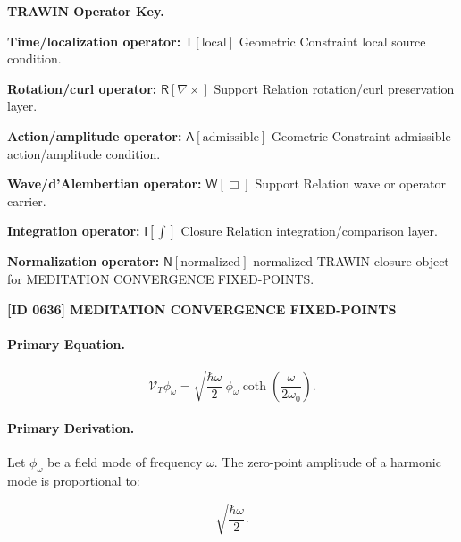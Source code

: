 \par\vspace{0.45\baselineskip}
\noindent\begin{minipage}[t]{\linewidth}
\begingroup
\small
\raggedright
\textbf{TRAWIN Operator Key.}\par
\noindent\textbf{Time/localization operator:} $\mathsf{T}\!\left[\mathrm{local}\right]$ Geometric Constraint local source condition.\par
\noindent\textbf{Rotation/curl operator:} $\mathsf{R}\!\left[\nabla\times\right]$ Support Relation rotation/curl preservation layer.\par
\noindent\textbf{Action/amplitude operator:} $\mathsf{A}\!\left[\mathrm{admissible}\right]$ Geometric Constraint admissible action/amplitude condition.\par
\noindent\textbf{Wave/d'Alembertian operator:} $\mathsf{W}\!\left[\Box\right]$ Support Relation wave or operator carrier.\par
\noindent\textbf{Integration operator:} $\mathsf{I}\!\left[\int\right]$ Closure Relation integration/comparison layer.\par
\noindent\textbf{Normalization operator:} $\mathsf{N}\!\left[\mathrm{normalized}\right]$ normalized TRAWIN closure object for MEDITATION CONVERGENCE FIXED-POINTS.\par
\endgroup
\end{minipage}

\clearpage
\noindent\textbf{[ID 0636] MEDITATION CONVERGENCE FIXED-POINTS}\par
\vspace{0.35em}
\paragraph{Primary Equation.}
\begin{equation}
\mathcal{V}_T\phi_{\omega}
=
\sqrt{
\frac{\hbar\omega}{2}
}
\,\phi_{\omega}
\coth\left(
\frac{\omega}{2\omega_0}
\right).
\end{equation}

\paragraph{Primary Derivation.}
Let $\phi_{\omega}$ be a field mode of frequency $\omega$.  
The zero-point amplitude of a harmonic mode is proportional to:

\begin{equation}
\sqrt{\frac{\hbar\omega}{2}} .
\end{equation}

